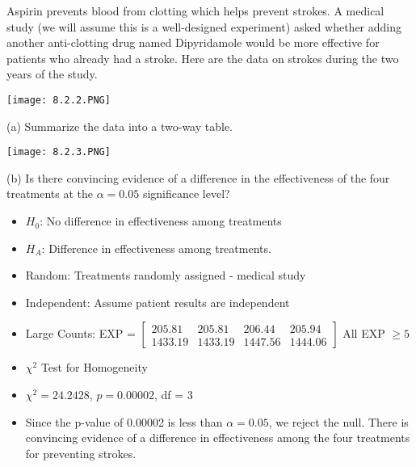 \documentclass[../stats.tex]{subfiles}
\begin{document}
\begin{example}
    Aspirin prevents blood from clotting which helps prevent strokes. A medical study (we will assume this is a well-designed experiment) asked whether adding another anti-clotting drug named Dipyridamole would be more effective for patients who already had a stroke. Here are the data on strokes during the two years of the study.

    \begin{center}
        \texttt{[image: 8.2.2.PNG]}
    \end{center}

    (a) Summarize the data into a two-way table.
    \begin{center}
        \texttt{[image: 8.2.3.PNG]}
    \end{center}

    (b) Is there convincing evidence of a difference in the effectiveness of the four treatments at the $\alpha=0.05$ significance level?
    \begin{itemize}
        \item $H_0$: No difference in effectiveness among treatments 

        \item $H_A$: Difference in effectiveness among treatments.

        \item Random: Treatments randomly assigned - medical study 
        \item Independent: Assume patient results are independent
        \item Large Counts: EXP = $\begin{bmatrix}
            205.81 & 205.81 & 206.44 & 205.94 \\
            1433.19 & 1433.19 & 1447.56 & 1444.06
        \end{bmatrix}$ All EXP $\geq 5$

        \item $\chi^2$ Test for Homogeneity
        \item $\chi^2 = 24.2428$, $p=0.00002$, df = 3
        \item Since the p-value of 0.00002 is less than $\alpha=0.05$, we reject the null. There is convincing evidence of a difference in effectiveness among the four treatments for preventing strokes.
    \end{itemize}
\end{example}
\end{document}
